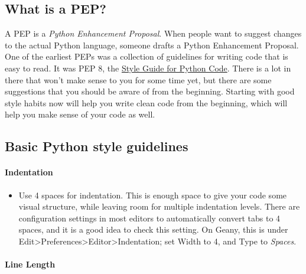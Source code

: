 \documentclass[11pt]{article}
\providecommand{\tightlist}{%
      \setlength{\itemsep}{0pt}\setlength{\parskip}{0pt}}
\begin{document}
\hypertarget{what-is-a-pep}{%
\subsection{What is a PEP?}\label{what-is-a-pep}}

A PEP is a \emph{Python Enhancement Proposal}. When people want to
suggest changes to the actual Python language, someone drafts a Python
Enhancement Proposal. One of the earliest PEPs was a collection of
guidelines for writing code that is easy to read. It was PEP 8, the
\href{http://www.python.org/dev/peps/pep-0008/}{Style Guide for Python
Code}. There is a lot in there that won't make sense to you for some
time yet, but there are some suggestions that you should be aware of
from the beginning. Starting with good style habits now will help you
write clean code from the beginning, which will help you make sense of
your code as well.

\hypertarget{basic-python-style-guidelines}{%
\subsection{Basic Python style
guidelines}\label{basic-python-style-guidelines}}

\hypertarget{indentation}{%
\paragraph{Indentation}\label{indentation}}

\begin{itemize}
\tightlist
\item
  Use 4 spaces for indentation. This is enough space to give your code
  some visual structure, while leaving room for multiple indentation
  levels. There are configuration settings in most editors to
  automatically convert tabs to 4 spaces, and it is a good idea to check
  this setting. On Geany, this is under
  Edit\textgreater Preferences\textgreater Editor\textgreater Indentation;
  set Width to 4, and Type to \emph{Spaces}.
\end{itemize}

\hypertarget{line-length}{%
\paragraph{Line Length}\label{line-length}}
\end{document}
